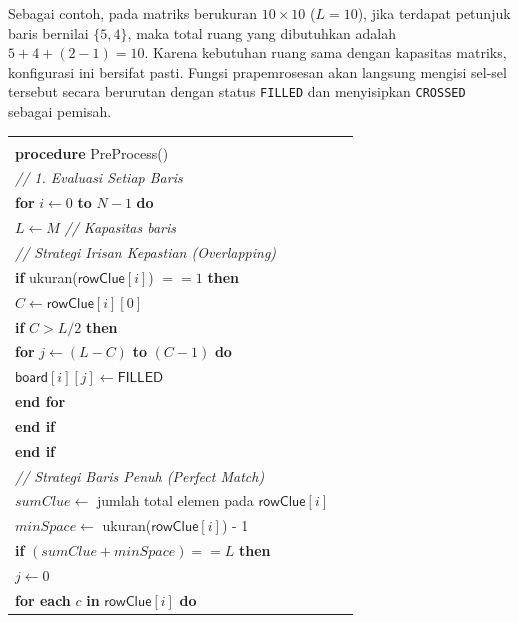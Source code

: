 \documentclass[conference]{IEEEtran}
\begin{document}
Sebagai contoh, pada matriks berukuran $10 \times 10$ ($L = 10$), jika terdapat petunjuk baris bernilai $\{5, 4\}$, maka total ruang yang dibutuhkan adalah $5 + 4 + (2 - 1) = 10$. Karena kebutuhan ruang sama dengan kapasitas matriks, konfigurasi ini bersifat pasti. Fungsi prapemrosesan akan langsung mengisi sel-sel tersebut secara berurutan dengan status \texttt{FILLED} dan menyisipkan \texttt{CROSSED} sebagai pemisah.

\begin{table}[H] 
\centering
\small 
\begin{tabular}{|p{0.95\linewidth}|} 
\hline
\vspace{-0.5em} \\ 
\textbf{procedure} \textsf{PreProcess}() \\
\quad \textit{// 1. Evaluasi Setiap Baris} \\
\quad \textbf{for} $i \leftarrow 0$ \textbf{to} $N - 1$ \textbf{do} \\
\quad \quad $L \leftarrow M$ \textit{// Kapasitas baris} \\
\quad \quad \textit{// Strategi Irisan Kepastian (Overlapping)} \\
\quad \quad \textbf{if} ukuran($\textsf{rowClue}[i]$) $== 1$ \textbf{then} \\
\quad \quad \quad $C \leftarrow \textsf{rowClue}[i][0]$ \\
\quad \quad \quad \textbf{if} $C > L / 2$ \textbf{then} \\
\quad \quad \quad \quad \textbf{for} $j \leftarrow (L - C)$ \textbf{to} $(C - 1)$ \textbf{do} \\
\quad \quad \quad \quad \quad $\textsf{board}[i][j] \leftarrow \textsf{FILLED}$ \\
\quad \quad \quad \quad \textbf{end for} \\
\quad \quad \quad \textbf{end if} \\
\quad \quad \textbf{end if} \\
\quad \quad \textit{// Strategi Baris Penuh (Perfect Match)} \\
\quad \quad $sumClue \leftarrow$ jumlah total elemen pada $\textsf{rowClue}[i]$ \\
\quad \quad $minSpace \leftarrow$ ukuran($\textsf{rowClue}[i]$) - 1 \\
\quad \quad \textbf{if} $(sumClue + minSpace) == L$ \textbf{then} \\
\quad \quad \quad $j \leftarrow 0$ \\
\quad \quad \quad \textbf{for each} $c$ \textbf{in} $\textsf{rowClue}[i]$ \textbf{do} \\

\end{tabular}
\end{table}
\end{document}
